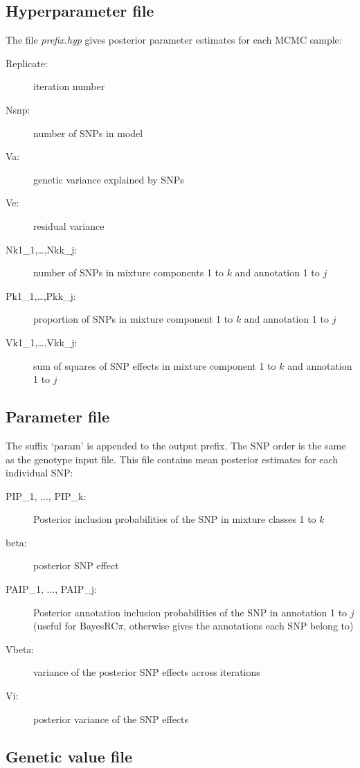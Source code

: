 \documentclass{ol-softwaremanual}
\begin{document}
\subsection{Hyperparameter file}

The file \textit{prefix.hyp} gives posterior parameter estimates for each MCMC sample: 

\begin{description}
    \item[Replicate:] iteration number
    \item[Nsnp:] number of SNPs in model
    \item[Va:] genetic variance explained by SNPs
    \item[Ve:] residual variance
    \item[Nk1\_1,…,Nkk\_j:] number of SNPs in mixture components 1 to $k$ and annotation 1 to $j$
    \item[Pk1\_1,…,Pkk\_j: ] proportion of SNPs in mixture component 1 to $k$ and annotation 1 to $j$
    \item[Vk1\_1,…,Vkk\_j:] sum of squares of SNP effects in mixture component 1 to $k$ and annotation 1 to $j$
\end{description}


\subsection{Parameter file}

The suffix ‘param’ is appended to the output prefix. The SNP order is the same as the genotype input file. This file contains mean posterior estimates for each individual SNP:

\begin{description}
    \item[PIP\_1, ..., PIP\_k:] Posterior inclusion probabilities of the SNP in mixture classes 1 to $k$
    \item[beta:] posterior SNP effect 
    \item[PAIP\_1, ..., PAIP\_j:]  Posterior annotation inclusion probabilities of the SNP in annotation 1 to $j$ (useful for BayesRC$\pi$, otherwise gives the annotations each SNP belong to)
    \item[Vbeta:] variance of the posterior SNP effects across iterations
    \item[Vi:] posterior variance of the SNP effects
\end{description}


\subsection{Genetic value file}
\end{document}
